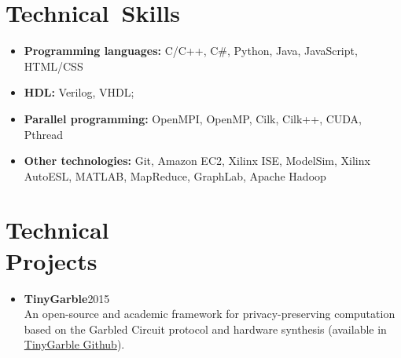 \documentclass[overlapped]{res}
\begin{document}
\begin{resume}
\section{Technical\ Skills}
\begin{itemize}
\item {\bf Programming languages:} C/C++, C\#, Python, Java, JavaScript, HTML/CSS
\item {\bf HDL:} Verilog, VHDL; 
\item {\bf Parallel programming:} OpenMPI, OpenMP, Cilk, Cilk++, CUDA, Pthread
\item {\bf Other technologies:} Git, Amazon EC2, Xilinx ISE, ModelSim, Xilinx AutoESL, MATLAB, MapReduce, GraphLab, Apache Hadoop
\end{itemize}

\section{Technical\\ Projects}
\begin{itemize}
\item {\bf TinyGarble}\hfill 2015\\
An open-source and academic framework for privacy-preserving computation based on the Garbled Circuit protocol and hardware synthesis (available in \href{https://github.com/esonghori/TinyGarble}{TinyGarble Github}).
\end{itemize}


\end{resume}
\end{document}
